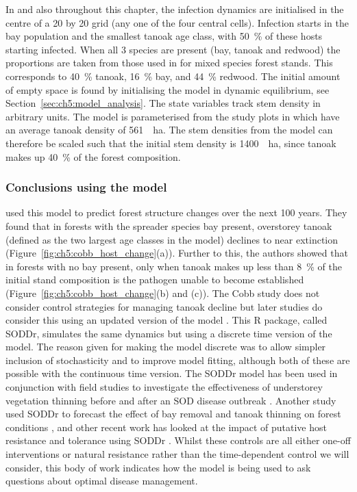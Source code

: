 In \citet{cobb_ecosystem_2012} and also throughout this chapter, the infection dynamics are initialised in the centre of a 20 by 20 grid (any one of the four central cells). Infection starts in the bay population and the smallest tanoak age class, with \SI{50}{\percent} of these hosts starting infected. When all 3 species are present (bay, tanoak and redwood) the proportions are taken from those used in \citet{cobb_ecosystem_2012} for mixed species forest stands. This corresponds to \SI{40}{\percent} tanoak, \SI{16}{\percent} bay, and \SI{44}{\percent} redwood. The initial amount of empty space is found by initialising the model in dynamic equilibrium, see Section~\ref{sec:ch5:model_analysis}. The state variables track stem density in arbitrary units. The model is parameterised from the study plots in \citet{cobb_ecosystem_2012} which have an average tanoak density of \SI{561}{\per\hectare}. The stem densities from the model can therefore be scaled such that the initial stem density is \SI{1400}{\per\hectare}, since tanoak makes up \SI{40}{\percent} of the forest composition.


\subsubsection{Conclusions using the model}

\citet{cobb_ecosystem_2012} used this model to predict forest structure changes over the next 100 years. They found that in forests with the spreader species bay present, overstorey tanoak (defined as the two largest age classes in the model) declines to near extinction (Figure~\ref{fig:ch5:cobb_host_change}(a)). Further to this, the authors showed that in forests with no bay present, only when tanoak makes up less than \SI{8}{\percent} of the initial stand composition is the pathogen unable to become established (Figure~\ref{fig:ch5:cobb_host_change}(b) and (c)). The Cobb study does not consider control strategies for managing tanoak decline but later studies do consider this using an updated version of the model \citep{ross_soddr_2013}. This R package, called SODDr, simulates the same dynamics but using a discrete time version of the model. The reason given for making the model discrete was to allow simpler inclusion of stochasticity and to improve model fitting, although both of these are possible with the continuous time version. The SODDr model has been used in conjunction with field studies to investigate the effectiveness of understorey vegetation thinning before and after an SOD disease outbreak \citep{cobb_resiliency_2017}. Another study used SODDr to forecast the effect of bay removal and tanoak thinning on forest conditions \citep{valachovic_forest_2017}, and other recent work has looked at the impact of putative host resistance and tolerance using SODDr \citep{cobb_promise_2019}. Whilst these controls are all either one-off interventions or natural resistance rather than the time-dependent control we will consider, this body of work indicates how the model is being used to ask questions about optimal disease management.

